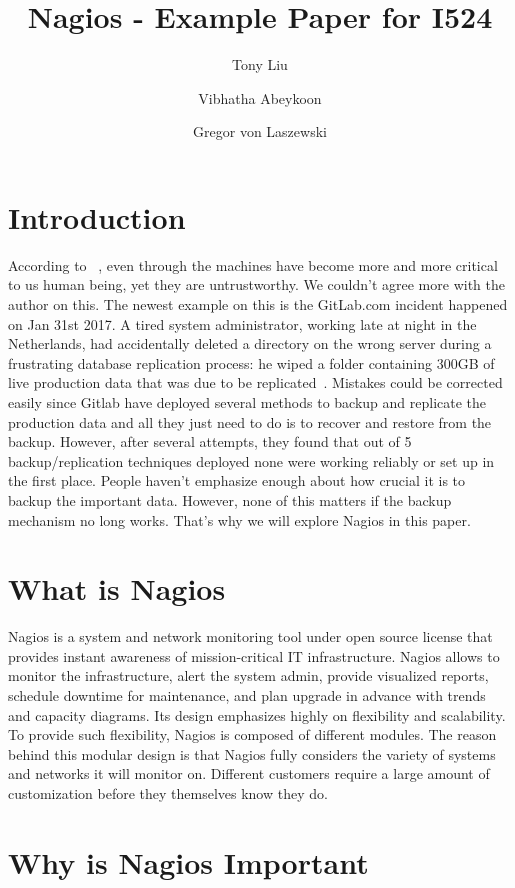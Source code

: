 \documentclass[9pt,twocolumn,twoside]{styles/osajnl}
\title{Nagios - Example Paper for I524}
\author[1]{Tony Liu}
\author[1]{Vibhatha Abeykoon}
\author[1]{Gregor von Laszewski}
\affil[1]{School of Informatics and Computing, Bloomington, IN 47408, U.S.A.}
\begin{document}
\maketitle

\section{Introduction}

According to ~\cite{nagios-book}, even through the machines have become more and 
more critical to us human being, yet they are untrustworthy. We couldn't agree more with the author on this. The newest example on this is the GitLab.com incident happened on Jan 31st 2017. A tired system administrator, working late at night in the Netherlands, had accidentally deleted a directory on the wrong server during a frustrating database replication process: he wiped a folder containing 300GB of live production data that was due to be replicated~\cite{gitlabmeltdown}. Mistakes could be corrected easily since Gitlab have deployed several methods to backup and replicate the production data and all they just need to do is to recover and restore from the backup. However, after several attempts, they found that out of 5 backup/replication techniques deployed none were working reliably or set up in the first place. People haven't emphasize enough about how crucial it is to backup the important data. However, none of this matters if the backup mechanism no long works. That's why we will explore Nagios in this paper.


\section{What is Nagios}

Nagios is a system and network monitoring tool under open source license that provides instant awareness of mission-critical IT infrastructure. Nagios allows to monitor the infrastructure, alert the system admin, provide visualized reports, schedule downtime for maintenance, and plan upgrade in advance with trends and capacity diagrams. Its design emphasizes highly on flexibility and scalability. To provide such flexibility, Nagios is composed of different modules. The reason behind this modular design is that Nagios fully considers the variety of systems and networks it will monitor on. Different customers require a large amount of customization before they themselves know they do.



\section{Why is Nagios Important}
\end{document}
